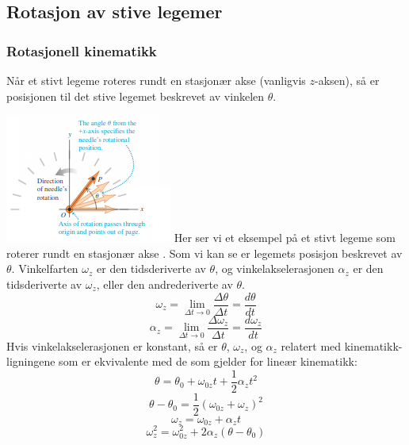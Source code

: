 \graphicspath{ {./bilder/} }

\subsection{Rotasjon av stive legemer}

\subsubsection{Rotasjonell kinematikk}
Når et stivt legeme roteres rundt en stasjonær akse (vanligvis $z$-aksen), så er posisjonen til det stive legemet beskrevet av vinkelen $\theta.$\newline\newline

\includegraphics{rapport/metode/bilder/theta.png}\newline\newline
Her ser vi et eksempel på et stivt legeme som roterer rundt en stasjonær akse \cite{FYSIKK:1}. Som vi kan se er legemets posisjon beskrevet av $\theta.$\newline\newline
Vinkelfarten $\omega_z$ er den tidsderiverte av $\theta$, og vinkelakselerasjonen $\alpha_z$ er den tidsderiverte av $\omega_z$, eller den andrederiverte av $\theta.$
\begin{equation}
    \omega_z=\lim_{\Delta t\rightarrow0}{\frac{\Delta\theta}{\Delta t}}=\frac{d\theta}{dt}
\end{equation}
\begin{equation}
    \alpha_z=\lim_{\Delta t\rightarrow0}{\frac{\Delta\omega_z}{\Delta t}}=\frac{d\omega_z}{dt}
\end{equation}
Hvis vinkelakselerasjonen er konstant, så er $\theta$, $\omega_z$, og $\alpha_z$ relatert med kinematikk-ligningene som er ekvivalente med de som gjelder for lineær kinematikk:
\begin{equation}
    \theta=\theta_0+\omega_{0z}t+\frac{1}{2}\alpha_zt^2
\end{equation}
\begin{equation}
    \theta-\theta_0=\frac{1}{2}\left(\omega_{0z}+\omega_z\right)^2
\end{equation}
\begin{equation}
    \omega_z=\omega_{0z}+\alpha_zt
\end{equation}
\begin{equation}
    \omega_z^2=\omega_{0z}^2+2\alpha_z(\theta-\theta_0)
\end{equation}


